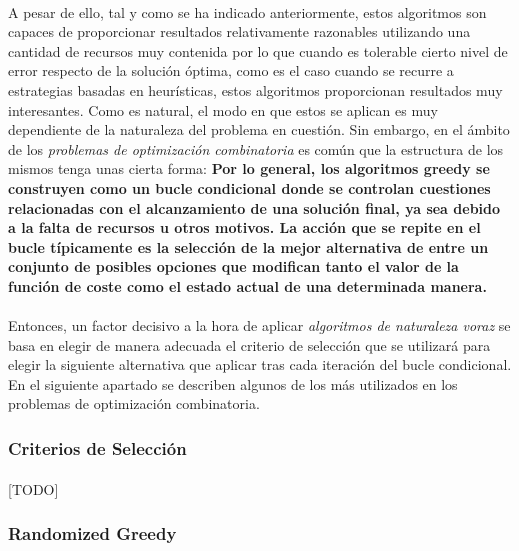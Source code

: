 \documentclass{subfiles}
\begin{document}
        \paragraph{}
        A pesar de ello, tal y como se ha indicado anteriormente, estos algoritmos son capaces de proporcionar resultados relativamente razonables utilizando una cantidad de recursos muy contenida por lo que cuando es tolerable cierto nivel de error respecto de la solución óptima, como es el caso cuando se recurre a estrategias basadas en heurísticas, estos algoritmos proporcionan resultados muy interesantes. Como es natural, el modo en que estos se aplican es muy dependiente de la naturaleza del problema en cuestión. Sin embargo, en el ámbito de los \emph{problemas de optimización combinatoria} es común que la estructura de los mismos tenga unas cierta forma: \textbf{Por lo general, los algoritmos greedy se construyen como un bucle condicional donde se controlan cuestiones relacionadas con el alcanzamiento de una solución final, ya sea debido a la falta de recursos u otros motivos. La acción que se repite en el bucle típicamente es la selección de la mejor alternativa de entre un conjunto de posibles opciones que modifican tanto el valor de la función de coste como el estado actual de una determinada manera.} 

        \paragraph{}
        Entonces, un factor decisivo a la hora de aplicar \emph{algoritmos de naturaleza voraz} se basa en elegir de manera adecuada el criterio de selección que se utilizará para elegir la siguiente alternativa que aplicar tras cada iteración del bucle condicional. En el siguiente apartado se describen algunos de los más utilizados en los problemas de optimización combinatoria.

        \subsubsection{Criterios de Selección}
        \label{sec:solving_greedy_criterions}

          \paragraph{}
          [TODO]

        \subsubsection{Randomized Greedy}
        \label{sec:solving_randomized_greedy}
\end{document}
